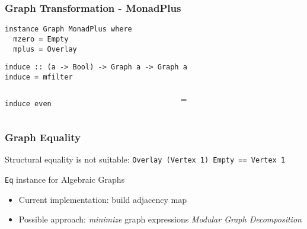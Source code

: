 \documentclass{beamer}
\newcommand{\hs}{\texttt}
\begin{document}
\begin{frame}[fragile]
  \frametitle{Graph Transformation - MonadPlus}
  \onslide<+->
  \begin{verbatim}
instance Graph MonadPlus where
  mzero = Empty
  mplus = Overlay
  \end{verbatim}
  \onslide<+->
  \begin{verbatim}
induce :: (a -> Bool) -> Graph a -> Graph a
induce = mfilter    
  \end{verbatim}
  \onslide<+->
  \vspace{5mm}
  \begin{columns}
    \begin{column}{.2\textwidth}
      \hs{induce even}
    \end{column}
    \begin{column}{.25\textwidth}
    \end{column}
    \begin{column}{.05\textwidth}
      {\LARGE $=$}
    \end{column}
    \begin{column}{.25\textwidth}
    \end{column}
  \end{columns}
\end{frame}

\begin{frame}
  \frametitle{Graph Equality}
  \onslide<+->
  Structural equality is not suitable: \hs{Overlay (Vertex 1) Empty == Vertex 1}
  \onslide<+->
  \begin{alertblock}{\hs{Eq} instance for Algebraic Graphs}
    \begin{itemize}
    \item Current implementation: build adjacency map
    \item<+-> Possible approach: \emph{minimize} graph expressions
      \textrightarrow \emph{Modular Graph Decomposition}
    \end{itemize}
  \end{alertblock}
\end{frame}
\end{document}

